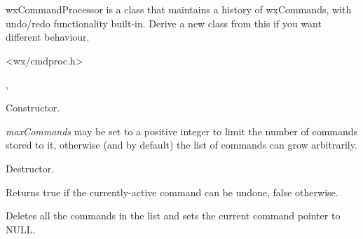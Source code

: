 \section{}\label{wxcommandprocessor}

wxCommandProcessor is a class that maintains a history of wxCommands,
with undo/redo functionality built-in. Derive a new class from this
if you want different behaviour.




<wx/cmdproc.h>


, 


\label{wxcommandprocessorctor}


Constructor.

{\it maxCommands} may be set to a positive integer to limit the number of
commands stored to it, otherwise (and by default) the list of commands can grow
arbitrarily.

\label{wxcommandprocessordtor}


Destructor.

\label{wxcommandprocessorcanundo}


Returns true if the currently-active command can be undone, false otherwise.

\label{wxcommandprocessorclearcommands}


Deletes all the commands in the list and sets the current command pointer to NULL.

\label{wxcommandprocessorredo}


